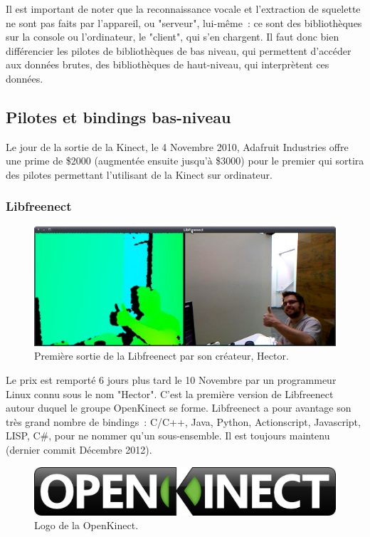 Il est important de noter que la reconnaissance vocale et l'extraction de 
squelette ne sont pas faits par l'appareil, ou "serveur", lui-même~: ce sont des
bibliothèques sur la console ou l'ordinateur, le "client", qui s'en chargent. 
Il faut donc bien
différencier les pilotes de bibliothèques de bas niveau, qui permettent 
d'accéder aux données brutes, des
bibliothèques de haut-niveau, qui interprètent ces données.

\subsection{Pilotes et bindings bas-niveau}
Le jour de la sortie de la Kinect, le 4 Novembre 2010, Adafruit Industries 
offre une prime de \$2000 (augmentée ensuite jusqu'à \$3000) pour le premier qui
sortira des pilotes permettant l'utilisant de la Kinect sur ordinateur.
\subsubsection{Libfreenect}
\begin{figure}[h!]
\centering
\includegraphics[width=\linewidth]{images/hector}
\caption{Première sortie de la Libfreenect par son créateur, Hector.}
\end{figure}
Le prix est remporté 6 jours plus tard le 10 Novembre par un programmeur Linux
connu sous le nom "Hector". C'est la première version de Libfreenect autour
duquel le groupe OpenKinect se forme. Libfreenect a pour avantage son
très grand nombre de bindings~: C/C++, Java, Python, Actionscript, Javascript,
LISP, C\#, pour ne nommer qu'un sous-ensemble. 
Il est toujours maintenu (dernier commit Décembre 2012).
\begin{figure}[h!]
\centering
\includegraphics[width=0.5\linewidth]{images/openkinect_logo}
\caption{Logo de la OpenKinect.}
\end{figure}
